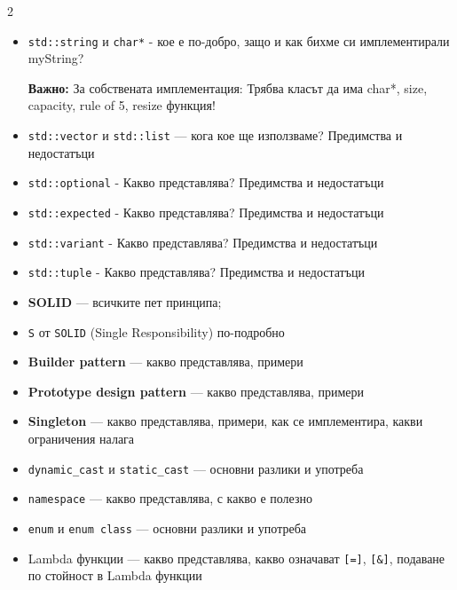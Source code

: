 \documentclass[a4paper,11pt]{article}
\newcommand{\nope}[1]{%
  \begin{tcolorbox}[warningbox]
    \faExclamationTriangle\quad\textbf{\color{warning}Важно:} #1
  \end{tcolorbox}%
}
\newcommand{\qtag}[1]{\texttt{\color{greenaccent}\small#1}}
\begin{document}
\begin{tcolorbox}[categorybox, title={10.\ STL типове и собствени имплементации}]
\begin{multicols}{2}
\begin{itemize}
  \item \qtag{std::string} и \qtag{char*} - кое е по-добро, защо и как бихме си имплементирали myString?
  \nope{За собствената имплементация: Трябва класът да има char*, size, capacity, rule of 5, resize функция!}
  \item \qtag{std::vector} и \qtag{std::list} — кога кое ще използваме? Предимства и недостатъци
  \item \qtag{std::optional} - Какво представлява? Предимства и недостатъци
  \item \qtag{std::expected} - Какво представлява? Предимства и недостатъци
  \item \qtag{std::variant} - Какво представлява? Предимства и недостатъци
  \item \qtag{std::tuple} - Какво представлява? Предимства и недостатъци
\end{itemize}
\end{multicols}
\end{tcolorbox}

\begin{tcolorbox}[categorybox, title={11.\ Дизайн принципи и шаблони}]
\begin{itemize}
  \item \textbf{SOLID} — всичките пет принципа; 
  \item \qtag{S} от \qtag{SOLID} (Single Responsibility) по-подробно
  \item \textbf{Builder pattern} — какво представлява, примери
  \item \textbf{Prototype design pattern} — какво представлява, примери
  \item \textbf{Singleton} — какво представлява, примери, как се имплементира, какви ограничения налага
\end{itemize}
\end{tcolorbox}

\begin{tcolorbox}[categorybox, title={12.\ Cast, Namespace, Enum, Lambda}]
\begin{itemize}
  \item \qtag{dynamic\_cast} и \qtag{static\_cast} — основни разлики и употреба 
  \item \qtag{namespace} — какво представлява, с какво е полезно
  \item \qtag{enum} и \qtag{enum class} — основни разлики и употреба
  \item Lambda функции — какво представлява, какво означават \texttt{[=]}, \texttt{[\&]}, подаване по стойност в Lambda функции
\end{itemize}
\end{tcolorbox}
\end{document}

